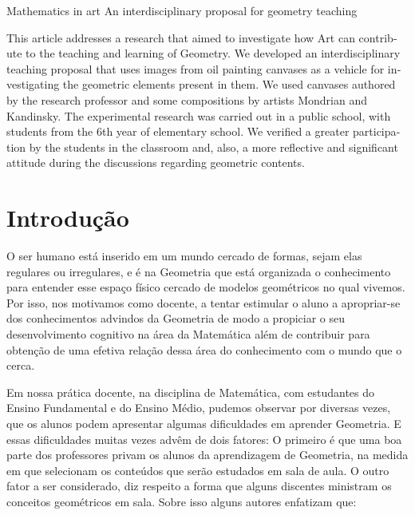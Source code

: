 \begin{refsection}
    
    \begin{otherlanguage}{english}
    
    \fakeChapterTwoLines
    {Mathematics in art}
    {An interdisciplinary proposal for geometry teaching}
    
    \begin{galoResumo}[Abstract]
        This article addresses a research that aimed to investigate how Art can contribute to the teaching and learning of Geometry. We developed an interdisciplinary teaching proposal that uses images from oil painting canvases as a vehicle for investigating the geometric elements present in them. We used canvases authored by the research professor and some compositions by artists Mondrian and Kandinsky. The experimental research was carried out in a public school, with students from the 6th year of elementary school. We verified a greater participation by the students in the classroom and, also, a more reflective and significant attitude during the discussions regarding geometric contents. 
    \end{galoResumo}
    
    \end{otherlanguage}

    \section{Introdução}

    O ser humano está inserido em um mundo cercado de formas, sejam elas regulares ou irregulares, e é na Geometria que está organizada o conhecimento para entender esse espaço físico cercado de modelos geométricos no qual vivemos. Por isso, nos motivamos como docente, a tentar estimular o aluno a apropriar-se dos conhecimentos advindos da Geometria de modo a propiciar o seu desenvolvimento cognitivo na área da Matemática além de contribuir para obtenção de uma efetiva relação dessa área do conhecimento com o mundo que o cerca. 

    Em nossa prática docente, na disciplina de Matemática, com estudantes do Ensino Fundamental e do Ensino Médio, pudemos observar por diversas vezes, que os alunos podem apresentar algumas dificuldades em aprender Geometria. E essas dificuldades muitas vezes advêm de dois fatores: O primeiro é que uma boa parte dos professores privam os alunos da aprendizagem de Geometria, na medida em que selecionam os conteúdos que serão estudados em sala de aula. O outro fator a ser considerado, diz respeito a forma que alguns discentes ministram os conceitos geométricos em sala. Sobre isso alguns autores enfatizam que: 


\end{refsection}
